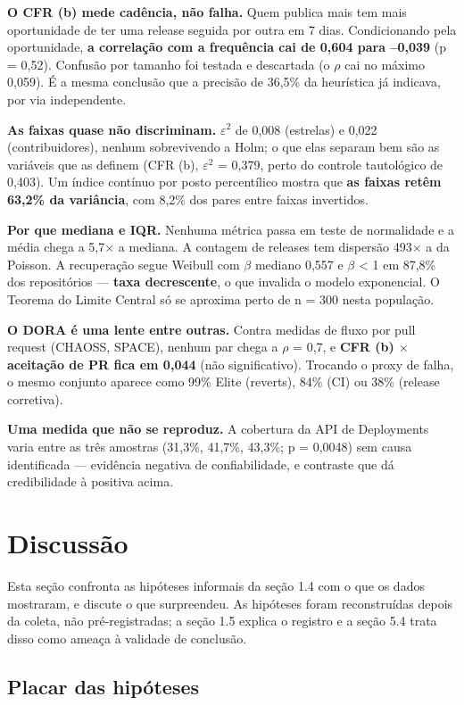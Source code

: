 \documentclass[12pt]{article}
\begin{document}
\textbf{O CFR (b) mede cadência, não falha.} Quem publica mais tem mais oportunidade de ter uma release seguida por outra em 7 dias. Condicionando pela oportunidade, \textbf{a correlação com a frequência cai de 0,604 para --0,039} (p = 0,52). Confusão por tamanho foi testada e descartada (o $\rho$ cai no máximo 0,059). É a mesma conclusão que a precisão de 36,5\% da heurística já indicava, por via independente.

\textbf{As faixas quase não discriminam.} $\varepsilon$$^2$ de 0,008 (estrelas) e 0,022 (contribuidores), nenhum sobrevivendo a Holm; o que elas separam bem são as variáveis que as definem (CFR (b), $\varepsilon$$^2$ = 0,379, perto do controle tautológico de 0,403). Um índice contínuo por posto percentílico mostra que \textbf{as faixas retêm 63,2\% da variância}, com 8,2\% dos pares entre faixas invertidos.

\textbf{Por que mediana e IQR.} Nenhuma métrica passa em teste de normalidade e a média chega a 5,7$\times$ a mediana. A contagem de releases tem dispersão 493$\times$ a da Poisson. A recuperação segue Weibull com $\beta$ mediano 0,557 e $\beta$ < 1 em 87,8\% dos repositórios — \textbf{taxa decrescente}, o que invalida o modelo exponencial. O Teorema do Limite Central só se aproxima perto de n = 300 nesta população.

\textbf{O DORA é uma lente entre outras.} Contra medidas de fluxo por pull request (CHAOSS, SPACE), nenhum par chega a $\rho$ = 0,7, e \textbf{CFR (b) $\times$ aceitação de PR fica em 0,044} (não significativo). Trocando o proxy de falha, o mesmo conjunto aparece como 99\% Elite (reverts), 84\% (CI) ou 38\% (release corretiva).

\textbf{Uma medida que não se reproduz.} A cobertura da API de Deployments varia entre as três amostras (31,3\%, 41,7\%, 43,3\%; p = 0,0048) sem causa identificada — evidência negativa de confiabilidade, e contraste que dá credibilidade à positiva acima.


\section{Discussão}

Esta seção confronta as hipóteses informais da seção 1.4 com o que os dados mostraram, e discute o que surpreendeu. As hipóteses foram reconstruídas depois da coleta, não pré-registradas; a seção 1.5 explica o registro e a seção 5.4 trata disso como ameaça à validade de conclusão.

\subsection{Placar das hipóteses}
\end{document}
